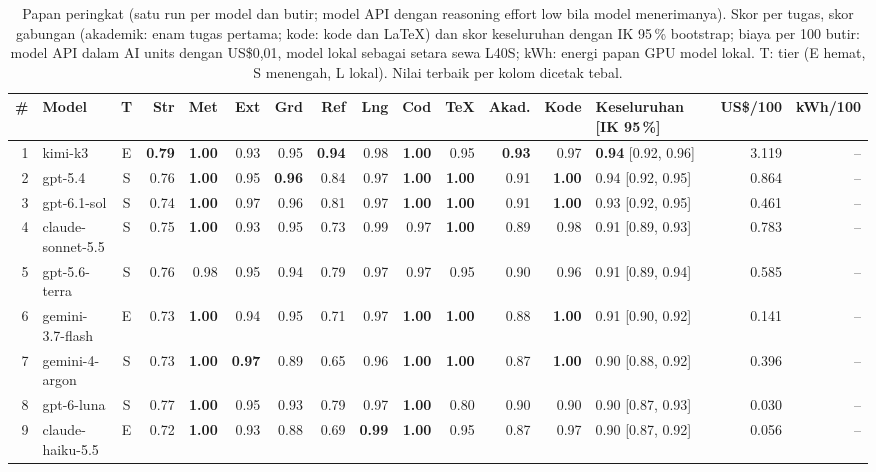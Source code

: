 \begin{table}[t]
  \caption{Papan peringkat (satu run per model dan butir; model API dengan reasoning effort low bila model menerimanya). Skor per tugas, skor gabungan (akademik: enam tugas pertama; kode: kode dan LaTeX) dan skor keseluruhan dengan IK 95\,\% bootstrap; biaya per 100 butir: model API dalam AI units dengan US\$0,01, model lokal sebagai setara sewa L40S; kWh: energi papan GPU model lokal. T: tier (E hemat, S menengah, L lokal). Nilai terbaik per kolom dicetak tebal.}
  \label{tab:leaderboard}
  \centering
  \scriptsize
  \setlength{\tabcolsep}{2.6pt}
  \begin{tabular}{@{}r l c rrrrrrrr r r l r r@{}}
    \toprule
    \# & Model & T & Str & Met & Ext & Grd & Ref & Lng & Cod & TeX & Akad. & Kode & Keseluruhan [IK 95\,\%] & US\$/100 & kWh/100 \\
    \midrule
    1 & kimi-k3 & E & \textbf{0.79} & \textbf{1.00} & 0.93 & 0.95 & \textbf{0.94} & 0.98 & \textbf{1.00} & 0.95 & \textbf{0.93} & 0.97 & \textbf{0.94} [0.92, 0.96] & 3.119 & -- \\
    2 & gpt-5.4 & S & 0.76 & \textbf{1.00} & 0.95 & \textbf{0.96} & 0.84 & 0.97 & \textbf{1.00} & \textbf{1.00} & 0.91 & \textbf{1.00} & 0.94 [0.92, 0.95] & 0.864 & -- \\
    3 & gpt-6.1-sol & S & 0.74 & \textbf{1.00} & 0.97 & 0.96 & 0.81 & 0.97 & \textbf{1.00} & \textbf{1.00} & 0.91 & \textbf{1.00} & 0.93 [0.92, 0.95] & 0.461 & -- \\
    4 & claude-sonnet-5.5 & S & 0.75 & \textbf{1.00} & 0.93 & 0.95 & 0.73 & 0.99 & 0.97 & \textbf{1.00} & 0.89 & 0.98 & 0.91 [0.89, 0.93] & 0.783 & -- \\
    5 & gpt-5.6-terra & S & 0.76 & 0.98 & 0.95 & 0.94 & 0.79 & 0.97 & 0.97 & 0.95 & 0.90 & 0.96 & 0.91 [0.89, 0.94] & 0.585 & -- \\
    6 & gemini-3.7-flash & E & 0.73 & \textbf{1.00} & 0.94 & 0.95 & 0.71 & 0.97 & \textbf{1.00} & \textbf{1.00} & 0.88 & \textbf{1.00} & 0.91 [0.90, 0.92] & 0.141 & -- \\
    7 & gemini-4-argon & S & 0.73 & \textbf{1.00} & \textbf{0.97} & 0.89 & 0.65 & 0.96 & \textbf{1.00} & \textbf{1.00} & 0.87 & \textbf{1.00} & 0.90 [0.88, 0.92] & 0.396 & -- \\
    8 & gpt-6-luna & S & 0.77 & \textbf{1.00} & 0.95 & 0.93 & 0.79 & 0.97 & \textbf{1.00} & 0.80 & 0.90 & 0.90 & 0.90 [0.87, 0.93] & 0.030 & -- \\
    9 & claude-haiku-5.5 & E & 0.72 & \textbf{1.00} & 0.93 & 0.88 & 0.69 & \textbf{0.99} & \textbf{1.00} & 0.95 & 0.87 & 0.97 & 0.90 [0.87, 0.92] & 0.056 & -- \\

\end{tabular}
\end{table}
